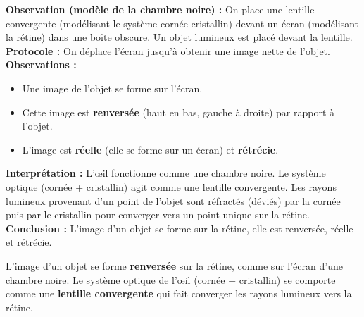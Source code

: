 \documentclass[11pt]{article}
\begin{document}
\begin{experience}
\textbf{Observation (modèle de la chambre noire) :} On place une lentille convergente (modélisant le système cornée-cristallin) devant un écran (modélisant la rétine) dans une boîte obscure. Un objet lumineux est placé devant la lentille.
\textbf{Protocole :} On déplace l'écran jusqu'à obtenir une image nette de l'objet.
\textbf{Observations :}
\begin{itemize}
    \item Une image de l'objet se forme sur l'écran.
    \item Cette image est \textbf{renversée} (haut en bas, gauche à droite) par rapport à l'objet.
    \item L'image est \textbf{réelle} (elle se forme sur un écran) et \textbf{rétrécie}.
\end{itemize}
\textbf{Interprétation :} L'œil fonctionne comme une chambre noire. Le système optique (cornée + cristallin) agit comme une lentille convergente. Les rayons lumineux provenant d'un point de l'objet sont réfractés (déviés) par la cornée puis par le cristallin pour converger vers un point unique sur la rétine.
\textbf{Conclusion :} L'image d'un objet se forme sur la rétine, elle est renversée, réelle et rétrécie.
\end{experience}

\begin{propriete}
L'image d'un objet se forme \textbf{renversée} sur la rétine, comme sur l'écran d'une chambre noire. Le système optique de l'œil (cornée + cristallin) se comporte comme une \textbf{lentille convergente} qui fait converger les rayons lumineux vers la rétine.
\end{propriete}
\end{document}
